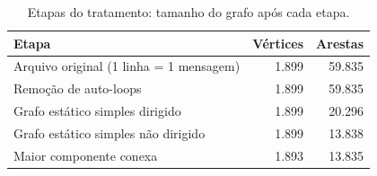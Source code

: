 \begin{table}
  \caption{Etapas do tratamento: tamanho do grafo após cada etapa.}
  \label{tab:tratamento}
  \small
  \begin{tabular}{p{4.2cm}rr}
    \toprule
    Etapa & Vértices & Arestas \\
    \midrule
    Arquivo original (1 linha = 1 mensagem) & 1.899 & 59.835 \\
    Remoção de auto-loops & 1.899 & 59.835 \\
    Grafo estático simples dirigido & 1.899 & 20.296 \\
    Grafo estático simples não dirigido & 1.899 & 13.838 \\
    Maior componente conexa & 1.893 & 13.835 \\
    \bottomrule
  \end{tabular}
\end{table}
